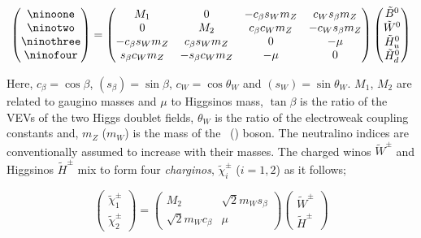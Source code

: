 				\begin{equation}
				\label{eq:neutralino_mixing}
					\begin{pmatrix}  \ninoone \\ \ninotwo \\ \ninothree \\ \ninofour \end{pmatrix}	
					= 
					\begin{pmatrix}
						M_1 & 0 & - c_\beta s_W m_Z &  c_W s_\beta m_Z  \\
						0 & M_2 & c_\beta c_W m_Z  &  - c_W s_\beta m_Z \\
						- c_\beta s_W m_Z  & c_\beta s_W m_Z  & 0 & - \mu \\ 
						s_\beta c_W m_Z  & - s_\beta c_W m_Z & - \mu & 0  
					\end{pmatrix}
					\begin{pmatrix}
						\tilde{B}^{0} \\
						\tilde{W}^{0} \\
						\tilde{H}^{0}_u \\
						\tilde{H}^{0}_d
					\end{pmatrix}
				\end{equation}

				\noindent Here, $c_{\beta} = \cos \beta$,  $(s_{\beta}) = \sin \beta$, $c_W = \cos \theta_W$ and $(s_W) = \sin \theta_W$. $M_1$, $M_2$ are related to gaugino masses and $\mu$ to Higgsinos mass, $\tan \beta$ is the ratio of the \ac{VEV}s of the two Higgs doublet fields, $\theta_W$ is the ratio of the electroweak coupling constants and, $m_Z$ ($m_W$) is the mass of the \Zboson\ (\Wboson) boson. The neutralino indices are conventionally assumed to increase with their masses. The charged winos $\tilde{W}^{\pm}$ and Higgsinos $\tilde{H}^{\pm}$ mix to form four \textit{charginos}, $\tilde{\chi}^{\pm}_i$ ($i=1,2$) as it follows;

				\begin{equation}
				\label{eq:chargino_mixing}
						\begin{pmatrix}  \tilde{\chi}^{\pm}_1 \\ \tilde{\chi}^{\pm}_2 \end{pmatrix}	
						= 
						\begin{pmatrix}
							M_2 & \sqrt{2} m_W s_\beta \\
							\sqrt{2} m_W c_\beta & \mu  
						\end{pmatrix}
						\begin{pmatrix}
							\tilde{W}^{\pm} \\
							\tilde{H}^{\pm}
						\end{pmatrix}
				\end{equation}

